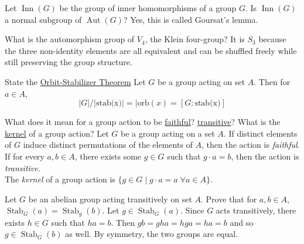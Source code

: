 \documentclass[avery5371,grid]{flashcards}
\DeclareMathOperator{\Orb}{Orb}
\DeclareMathOperator{\Stab}{Stab}
\DeclareMathOperator{\Aut}{Aut}
\DeclareMathOperator{\Inn}{Inn}
\begin{document}
\begin{flashcard}[Groups]{Let $\Inn(G)$ be the group of inner homomorphisms of a group $G$. Is $\Inn(G)$ a normal subgroup of $\Aut(G)$?}
 Yes, this is called Goursat's lemma.
\end{flashcard}



\begin{flashcard}[Groups]{What is the automorphism group of $V_4$, the Klein four-group?}
 It is $S_3$ because the three non-identity elements are all equivalent and can be shuffled freely while still preserving the group structure.
\end{flashcard}

\begin{flashcard}[Groups]{State the \underline{Orbit-Stabilizer Theorem}}
 Let $G$ be a group acting on set $A$. Then for $a \in A$,
 $$
 |G|/|\text{stab(x)}|=|\text{orb}(x)=[G:\text{stab(x)}]
 $$
 
\end{flashcard}

\begin{flashcard}[Groups]{What does it mean for a group action to be \underline{faithful}? \underline{transitive}? What is the \underline{kernel} of a group action?}
 Let $G$ be a group acting on a set $A$. If distinct elements of $G$ induce distinct permutations of the elements of $A$, then the action is \emph{faithful}.\\
 
 If for every $a,b \in A$, there exists some $g \in G$ such that $g \cdot a = b$, then the action is \emph{transitive}.\\
 
 The \emph{kernel} of a group action is $\{g \in G \mid g \cdot a = a \; \forall a \in A \}$.
\end{flashcard}

\begin{flashcard}[Groups]{Let $G$ be an abelian group acting transitively on set $A$. Prove that for $a,b \in A$, $\Stab_G(a) = \Stab_g(b)$.}
 Let $g \in \Stab_G(a)$. Since $G$ acts transitively, there exists $h \in G$ such that $ha = b$. Then $gb = gha = hga = ha = b$ and so $g \in \Stab_G(b)$ as well. By symmetry, the two groups are equal.
\end{flashcard}
\end{document}
